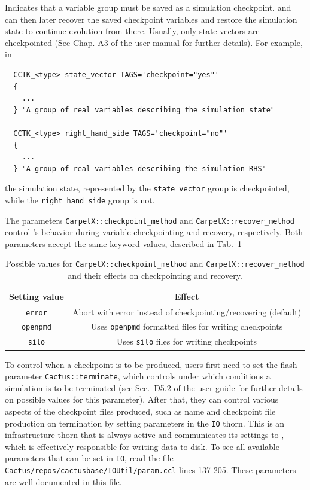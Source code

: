 Indicates that a variable group must be saved as a simulation checkpoint. \Cactus\space and \CarpetX\space can then later recover the saved checkpoint variables and restore the simulation state to continue evolution from there. Usually, only state vectors are checkpointed (See Chap. A3 of the \Cactus user manual for further details). For example, in
%
\begin{verbatim}
  CCTK_<type> state_vector TAGS='checkpoint="yes"'
  {
    ...
  } "A group of real variables describing the simulation state"

  CCTK_<type> right_hand_side TAGS='checkpoint="no"'
  {
    ...
  } "A group of real variables describing the simulation RHS"
\end{verbatim}
%
the simulation state, represented by the \texttt{state\_vector} group is checkpointed, while the \texttt{right\_hand\_side} group is not.

The parameters \texttt{CarpetX::checkpoint\_method} and \texttt{CarpetX::recover\_method} control \CarpetX's behavior during variable checkpointing and recovery, respectively. Both parameters accept the same keyword values, described in Tab.~\ref{tab:checkpoint_recovery}

\begin{table}[hb]
  \centering
  \begin{tabular}{cc}
  Setting value    & Effect                                                         \\ \hline\hline
  \texttt{error}   & Abort with error instead of checkpointing/recovering (default) \\
  \texttt{openpmd} & Uses \texttt{openpmd} formatted files for writing checkpoints  \\
  \texttt{silo}    & Uses \texttt{silo} files for writing checkpoints               \\ \hline\hline
  \end{tabular}
  \caption{Possible values for \texttt{CarpetX::checkpoint\_method} and \texttt{CarpetX::recover\_method} and their effects on checkpointing and recovery.}
  \label{tab:checkpoint_recovery}
\end{table}


To control when a checkpoint is to be produced, users first need to set the flash parameter \texttt{Cactus::terminate}, which controls under which conditions a simulation is to be terminated (see Sec.~D5.2 of the \Cactus\space user guide for further details on possible values for this parameter). After that, they can control various aspects of the checkpoint files produced, such as name and checkpoint file production on termination by setting parameters in the \texttt{IO} thorn. This is an infrastructure thorn that is always active and communicates its settings to \CarpetX, which is effectively responsible for writing data to disk. To see all available parameters that can be set in \texttt{IO}, read the file \texttt{Cactus/repos/cactusbase/IOUtil/param.ccl} lines 137-205. These parameters are well documented in this file. 

